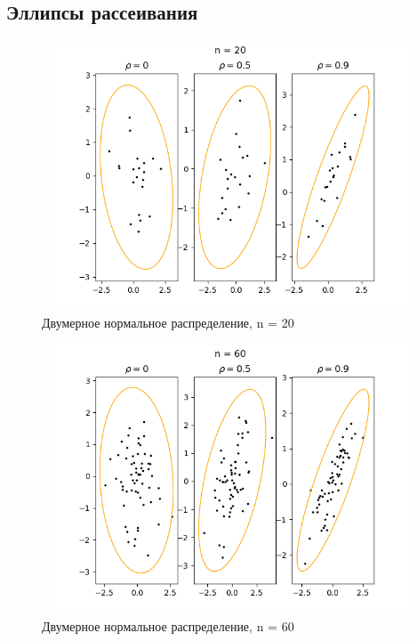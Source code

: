 \documentclass[../body.tex]{subfiles}
\begin{document}
	\subsection{Эллипсы рассеивания}
	
	\begin{figure}[H]
		\centering
		\includegraphics[width = 12cm, height = 8cm]{img/Ellipse n = 20.png}
		\caption{ Двумерное нормальное распределение, n = 20}
		\label{fig:f20}
	\end{figure}
	
	\begin{figure}[H]
		\centering
		\includegraphics[width = 12cm, height = 8cm]{img/Ellipse n = 60.png}
		\caption{Двумерное нормальное распределение, n = 60}
		\label{fig:f60}
	\end{figure}
	
\end{document}
